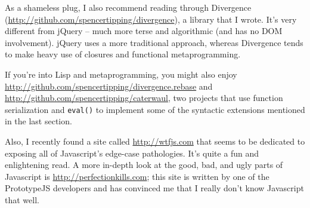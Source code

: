 \documentclass{article}
\begin{document}
  As a shameless plug, I also recommend reading through Divergence (\url{http://github.com/spencertipping/divergence}), a library that I wrote. It's very different from jQuery -- much more
  terse and algorithmic (and has no DOM involvement). jQuery uses a more traditional approach, whereas Divergence tends to make heavy use of closures and functional metaprogramming.

  If you're into Lisp and metaprogramming, you might also enjoy \url{http://github.com/spencertipping/divergence.rebase} and \url{http://github.com/spencertipping/caterwaul}, two projects that
  use function serialization and \verb|eval()| to implement some of the syntactic extensions mentioned in the last section.

  Also, I recently found a site called \url{http://wtfjs.com} that seems to be dedicated to exposing all of Javascript's edge-case pathologies. It's quite a fun and enlightening read. A more
  in-depth look at the good, bad, and ugly parts of Javascript is \url{http://perfectionkills.com}; this site is written by one of the PrototypeJS developers and has convinced me that I really
  don't know Javascript that well.
\end{document}

